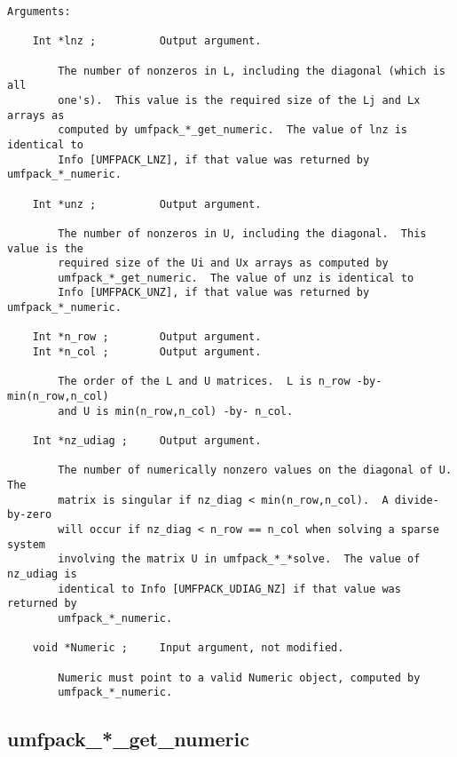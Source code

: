 {\begin{verbatim}
Arguments:

    Int *lnz ;          Output argument.

        The number of nonzeros in L, including the diagonal (which is all
        one's).  This value is the required size of the Lj and Lx arrays as
        computed by umfpack_*_get_numeric.  The value of lnz is identical to
        Info [UMFPACK_LNZ], if that value was returned by umfpack_*_numeric.

    Int *unz ;          Output argument.

        The number of nonzeros in U, including the diagonal.  This value is the
        required size of the Ui and Ux arrays as computed by
        umfpack_*_get_numeric.  The value of unz is identical to
        Info [UMFPACK_UNZ], if that value was returned by umfpack_*_numeric.

    Int *n_row ;        Output argument.
    Int *n_col ;        Output argument.

        The order of the L and U matrices.  L is n_row -by- min(n_row,n_col)
        and U is min(n_row,n_col) -by- n_col.

    Int *nz_udiag ;     Output argument.

        The number of numerically nonzero values on the diagonal of U.  The
        matrix is singular if nz_diag < min(n_row,n_col).  A divide-by-zero
        will occur if nz_diag < n_row == n_col when solving a sparse system
        involving the matrix U in umfpack_*_*solve.  The value of nz_udiag is
        identical to Info [UMFPACK_UDIAG_NZ] if that value was returned by
        umfpack_*_numeric.

    void *Numeric ;     Input argument, not modified.

        Numeric must point to a valid Numeric object, computed by
        umfpack_*_numeric.
\end{verbatim}
}

\newpage
\subsection{umfpack\_*\_get\_numeric}

